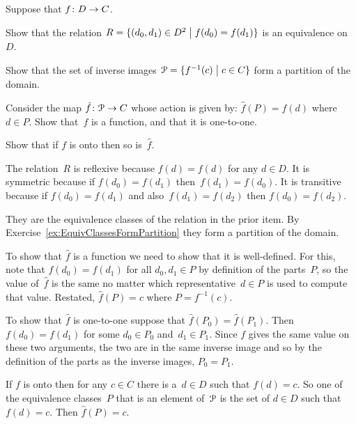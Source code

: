 \documentclass{test}  %
\begin{document}
\begin{ex}
Suppose that $\mbox{$f\colon D\to C$}$.
\begin{exes}
\item Show that the relation
  $R=\{(d_0,d_1)\in D^2 \bigm| f(d_0)=f(d_1)\}$ 
  is an equivalence on~$D$. 
\item Show that the set of inverse images 
  $\EuScript{P}=\{f^{-1}(c) \bigm| c\in C\}$ form a partition of the domain.
\item Consider the map
  $\mbox{$\hat{f}\colon \EuScript{P}\to C$}$ whose action is given by:
  $\hat{f}(P)=f(d)$ where $d\in P$.
  Show that~$\hat{f}$ is a function, and that it is one-to-one.
\item Show that if $f$ is onto then so is~$\hat{f}$.
\end{exes}
\begin{ans}
\begin{exes}
\item The relation~$R$ is reflexive because $f(d)=f(d)$ for any $d\in D$.
  It is symmetric because if $f(d_0)=f(d_1)$ then~$f(d_1)=f(d_0)$.
  It is transitive because if $f(d_0)=f(d_1)$ and also~$f(d_1)=f(d_2)$ 
  then $f(d_0)=f(d_2)$.
\item They are the equivalence classes of the relation in the prior 
  item.
  By Exercise~\ref{ex:EquivClassesFormPartition} they form a
  partition of the domain.
\item  To show that $\hat{f}$ is a function we need to show that
  it is well-defined.
  For this, note that $f(d_0)=f(d_1)$ for all $d_0,d_1\in P$
  by definition of the parts~$P$, so 
  the value of~$\hat{f}$ is the same no matter which representative~$d\in P$
  is used to compute that value.
  Restated, $\hat{f}(P)=c$ where $P=f^{-1}(c)$.

  To show that $\hat{f}$ is one-to-one suppose that $\hat{f}(P_0)=\hat{f}(P_1)$.
  Then $f(d_0)=f(d_1)$ for some $d_0\in P_0$ and~$d_1\in P_1$.
  Since $f$ gives the same value on these two arguments,
  the two are in the same inverse image and so  
  by the definition of the parts as the inverse images,
  $P_0=P_1$.
\item If $f$ is onto then for any $c\in C$ there is a~$d\in D$
  such that $f(d)=c$.
  So one of the equivalence classes~$P$ that is an element of~$\EuScript{P}$ 
  is the set of 
  $d\in D$ such that $f(d)=c$.
  Then $\hat{f}(P)=c$.
\end{exes}
\end{ans}
\end{ex}
\end{document}
